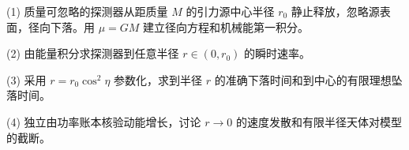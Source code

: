 (1) 质量可忽略的探测器从距质量 \(M\) 的引力源中心半径 \(r_0\) 静止释放，忽略源表面，径向下落。用 \(\mu=GM\) 建立径向方程和机械能第一积分。

(2) 由能量积分求探测器到任意半径 \(r\in(0,r_0)\) 的瞬时速率。

(3) 采用 \(r=r_0\cos^2\eta\) 参数化，求到半径 \(r\) 的准确下落时间和到中心的有限理想坠落时间。

(4) 独立由功率账本核验动能增长，讨论 \(r\to0\) 的速度发散和有限半径天体对模型的截断。
